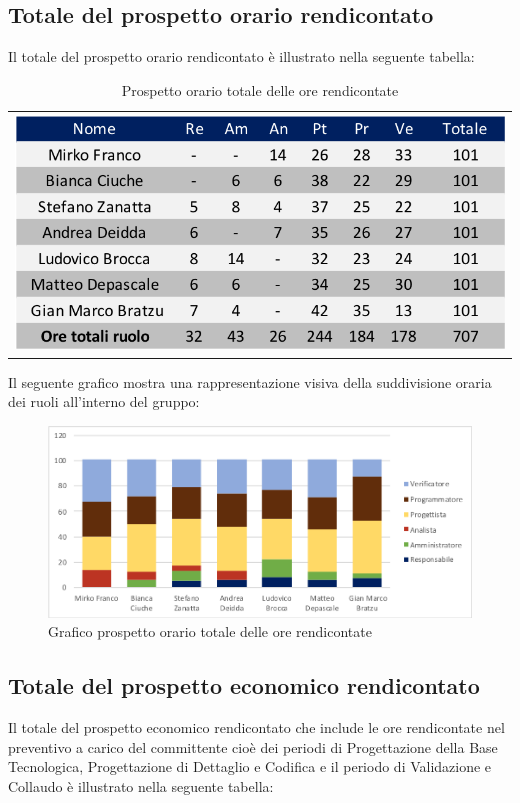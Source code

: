 \subsection{Totale del  prospetto orario rendicontato}
Il totale del prospetto orario rendicontato è illustrato nella seguente tabella:

\begin{table}[!ht]
	\begin{center}
		\begin{tabular}{c}
			\includegraphics{images/tabellaOreRendicontate.png}
		\end{tabular}
		\caption{Prospetto orario totale delle ore rendicontate}
	\end{center}
\end{table}

Il seguente grafico mostra una rappresentazione visiva della suddivisione oraria dei ruoli all'interno del gruppo:
\begin{figure}[!ht]
	\begin{center}
		\includegraphics[scale=0.80]{images/grafoOreRendicontate.png}
		\caption{Grafico prospetto orario totale delle ore rendicontate}
	\end{center}
\end{figure}

\subsection{Totale del prospetto economico rendicontato}
Il totale del prospetto economico rendicontato che  include le ore rendicontate nel preventivo a carico del committente cioè dei periodi di Progettazione della Base Tecnologica, Progettazione di Dettaglio e Codifica e il periodo di Validazione e Collaudo è illustrato nella seguente tabella:

